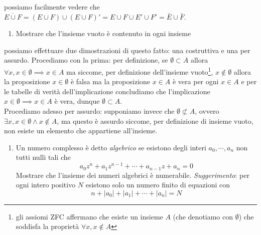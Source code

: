 \documentclass{report}
\begin{document}
\begin{myproof}
possiamo facilmente vedere che $\overline{E \cup F} = (E \cup F) \cup (E \cup F)' = E \cup F \cup E' \cup F' = \bar{E} \cup \bar{F}$.
\end{myproof}
\begin{enumerate}[label=\protect\circled{\arabic*}]
	\item Mostrare che l'insieme vuoto è contenuto in ogni insieme
\end{enumerate}
\begin{mysolution}
	possiamo effettuare due dimostrazioni di questo fatto: una costruttiva e una per assurdo. Procediamo con la prima: per definizione, se $\emptyset \subset A$ allora $\forall x, x \in \emptyset \implies x \in A$ ma siccome, per definizione dell'insieme vuoto\footnote{gli assiomi ZFC affermano che esiste un insieme $A$ (che denotiamo con $\emptyset$) che soddisfa la proprietà $\forall x, x \not\in A$}, $x \not\in \emptyset$ allora la proposizione $x \in \emptyset$ è falsa ma la proposizione $x \in A$ è vera per ogni $x \in A$ e per le tabelle di verità dell'implicazione concludiamo che l'implicazione $x \in \emptyset \implies x \in A$ è vera, dunque $\emptyset \subset A$. \\
	Procediamo adesso per assurdo: supponiamo invece che $\emptyset \not\subset A$, ovvero $\exists x, x \in \emptyset \wedge x \not\in A$, ma questo è assurdo siccome, per definizione di insieme vuoto, non esiste un elemento che appartiene all'insieme.
\end{mysolution}
\begin{enumerate}[resume, label=\protect\circled{\arabic*}]
	\item Un numero complesso è detto \emph{algebrico} se esistono degli interi $a_0, \cdots , a_n$ non tutti nulli tali che
	$$
		a_0z^n + a_1 z^{n-1} + \cdots + a_{n-1}z + a_n = 0
	$$
	Mostrare che l'insieme dei numeri algebrici è numerabile. \textit{Suggerimento}: per ogni intero positivo $N$ esistono solo un numero finito di equazioni con
	$$
		n + |a_0| + |a_1| + \cdots + |a_n| = N
	$$
\end{enumerate}
\end{document}
